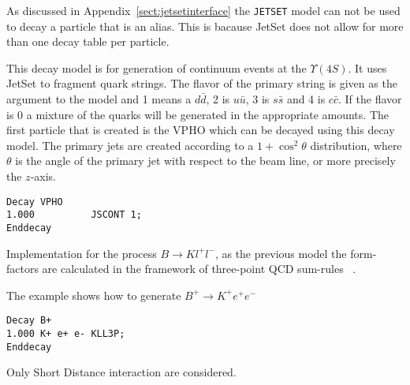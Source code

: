 \Notes
As discussed in Appendix~\ref{sect:jetsetinterface} the {\tt JETSET}
model can not be used to decay a particle that is an alias. This is 
bacause JetSet does not allow for more than one decay table per
particle.






\Expl
This decay model is for generation of continuum events at the 
$\Upsilon(4S)$. It uses JetSet to fragment quark strings. The
flavor of the primary string is given as the argument to the
model and 1 means a $d\bar d$, 2 is $u\bar u$, 3 is $s\bar s$ and
4 is $c\bar c$. If the flavor is 0 a mixture of the quarks will
be generated in the appropriate amounts. 
The first particle that is created is the VPHO which can be
decayed using this decay model.
The primary jets are created according to a $1+\cos^2\theta$
distribution, where $\theta$ is the angle of the primary jet
with respect to the beam line, or more precisely the $z$-axis.

\Example
\begin{verbatim}
Decay VPHO
1.000          JSCONT 1;
Enddecay
\end{verbatim}





\label{KLL3P}



\Expl
Implementation for the process $B\rightarrow K l^+ l^-$, as the previous model
the form-factors are calculated in the framework of three-point QCD sum-rules ~\cite{Colangelo96}.
 
\Example
The example shows how to generate $B^+\rightarrow K^{+} e^+ e^-$
\begin{verbatim}
Decay B+
1.000 K+ e+ e- KLL3P;
Enddecay
\end{verbatim}

\Notes
Only Short Distance interaction are considered.







%
%
%
%
%
%
%
%

